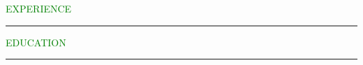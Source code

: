 \documentclass [
        11pt
] {article}
\begin{document}

\noindent\textcolor{green}{EXPERIENCE \rule{15.8cm}{1pt}}


\noindent\textcolor{green}{EDUCATION \rule{16cm}{1pt}}
\end{document}

